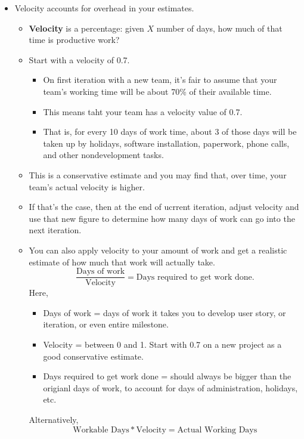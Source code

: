 \documentclass[letterpaper]{article}
\begin{document}
\begin{itemize}
    \item Velocity accounts for overhead in your estimates. 
    \begin{itemize}
        \item \textbf{Velocity} is a percentage: given $X$ number of days, how much of that time is productive work? 
        \item Start with a velocity of 0.7. 
        \begin{itemize}
            \item On first iteration with a new team, it's fair to assume that your team's working time will be about 70\% of their available time. 
            \item This means taht your team has a velocity value of 0.7. 
            \item That is, for every 10 days of work time, about 3 of those days will be taken up by holidays, software installation, paperwork, phone calls, and other nondevelopment tasks. 
        \end{itemize}
        \item This is a conservative estimate and you may find that, over time, your team's actual velocity is higher. 
        \item If that's the case, then at the end of ucrrent iteration, adjust velocity and use that new figure to determine how many days of work can go into the next iteration. 
        \item You can also apply velocity to your amount of work and get a realistic estimate of how much that work will actually take. 
        \[\frac{\text{Days of work}}{\text{Velocity}} = \text{Days required to get work done.}\]
        Here, 
        \begin{itemize}
            \item Days of work = days of work it takes you to develop user story, or iteration, or even entire milestone. 
            \item Velocity = between 0 and 1. Start with 0.7 on a new project as a good conservative estimate. 
            \item Days required to get work done = should always be bigger than the origianl days of work, to account for days of administration, holidays, etc. 
        \end{itemize}
        Alternatively,
        \[\text{Workable Days} * \text{Velocity} = \text{Actual Working Days}\]
    \end{itemize}


\end{itemize}
\end{document}
